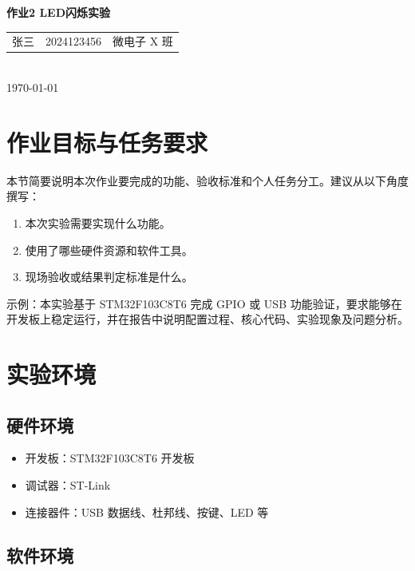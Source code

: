 \documentclass[12pt,a4paper]{ctexart}
\newcommand{\homeworkname}{作业2 LED闪烁实验}
\newcommand{\studentname}{张三}
\newcommand{\studentid}{2024123456}
\newcommand{\classname}{微电子 X 班}
\newcommand{\submitdate}{\today}
\begin{document}
\setcounter{tocdepth}{1}

\begin{center}
  {\bfseries \homeworkname \par}
  \vspace{0.8em}
  \begin{tabular}{ccc}
    \studentname & \studentid & \classname
  \end{tabular}
  \\
  \vspace{0.4em}
  \submitdate
\end{center}

\vspace{0.5em}
\tableofcontents
\vspace{0.8em}

\section{作业目标与任务要求}

本节简要说明本次作业要完成的功能、验收标准和个人任务分工。建议从以下角度撰写：

\begin{enumerate}[label=\arabic*.]
  \item 本次实验需要实现什么功能。
  \item 使用了哪些硬件资源和软件工具。
  \item 现场验收或结果判定标准是什么。
\end{enumerate}

示例：本实验基于 STM32F103C8T6 完成 GPIO 或 USB 功能验证，要求能够在开发板上稳定运行，并在报告中说明配置过程、核心代码、实验现象及问题分析。

\section{实验环境}

\subsection{硬件环境}

\begin{itemize}
  \item 开发板：STM32F103C8T6 开发板
  \item 调试器：ST-Link
  \item 连接器件：USB 数据线、杜邦线、按键、LED 等
\end{itemize}

\subsection{软件环境}
\end{document}
